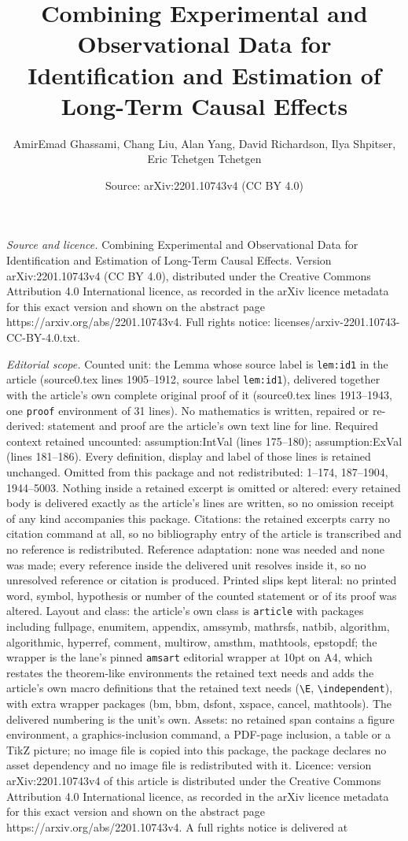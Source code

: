 \documentclass[10pt,a4paper]{amsart}
\title[Combining Experimental and Observational Data for Identifica]{Combining Experimental and Observational Data for Identification and Estimation of Long-Term Causal Effects}
\author{AmirEmad Ghassami, Chang Liu, Alan Yang, David Richardson, Ilya Shpitser, Eric Tchetgen Tchetgen}
\date{Source: arXiv:2201.10743v4 (CC BY 4.0)}
\begin{document}
\maketitle

\noindent\emph{Source and licence.} Combining Experimental and Observational Data for Identification and Estimation of Long-Term Causal Effects. Version arXiv:2201.10743v4 (CC BY 4.0), distributed under the Creative Commons Attribution 4.0 International licence, as recorded in the arXiv licence metadata for this exact version and shown on the abstract page https://arxiv.org/abs/2201.10743v4. Full rights notice: licenses/arxiv-2201.10743-CC-BY-4.0.txt.\par\smallskip

\noindent\textit{Editorial scope.} Counted unit: the Lemma whose source label is \texttt{lem:id1} in the article (source0.tex lines 1905--1912, source label \texttt{lem:id1}), delivered together with the article's own complete original proof of it (source0.tex lines 1913--1943, one \texttt{proof} environment of 31 lines). No mathematics is written, repaired or re-derived: statement and proof are the article's own text line for line. Required context retained uncounted: assumption:IntVal (lines 175--180); assumption:ExVal (lines 181--186). Every definition, display and label of those lines is retained unchanged. Omitted from this package and not redistributed: 1--174, 187--1904, 1944--5003. Nothing inside a retained excerpt is omitted or altered: every retained body is delivered exactly as the article's lines are written, so no omission receipt of any kind accompanies this package. Citations: the retained excerpts carry no citation command at all, so no bibliography entry of the article is transcribed and no reference is redistributed. Reference adaptation: none was needed and none was made; every reference inside the delivered unit resolves inside it, so no unresolved reference or citation is produced. Printed slips kept literal: no printed word, symbol, hypothesis or number of the counted statement or of its proof was altered. Layout and class: the article's own class is \texttt{article} with packages including fullpage, enumitem, appendix, amssymb, mathrsfs, natbib, algorithm, algorithmic, hyperref, comment, multirow, amsthm, mathtools, epstopdf; the wrapper is the lane's pinned \texttt{amsart} editorial wrapper at 10pt on A4, which restates the theorem-like environments the retained text needs and adds the article's own macro definitions that the retained text needs (\texttt{\textbackslash E}, \texttt{\textbackslash independent}), with extra wrapper packages (bm, bbm, dsfont, xspace, cancel, mathtools). The delivered numbering is the unit's own. Assets: no retained span contains a figure environment, a graphics-inclusion command, a PDF-page inclusion, a table or a TikZ picture; no image file is copied into this package, the package declares no asset dependency and no image file is redistributed with it. Licence: version arXiv:2201.10743v4 of this article is distributed under the Creative Commons Attribution 4.0 International licence, as recorded in the arXiv licence metadata for this exact version and shown on the abstract page https://arxiv.org/abs/2201.10743v4. A full rights notice is delivered at 
\end{document}
